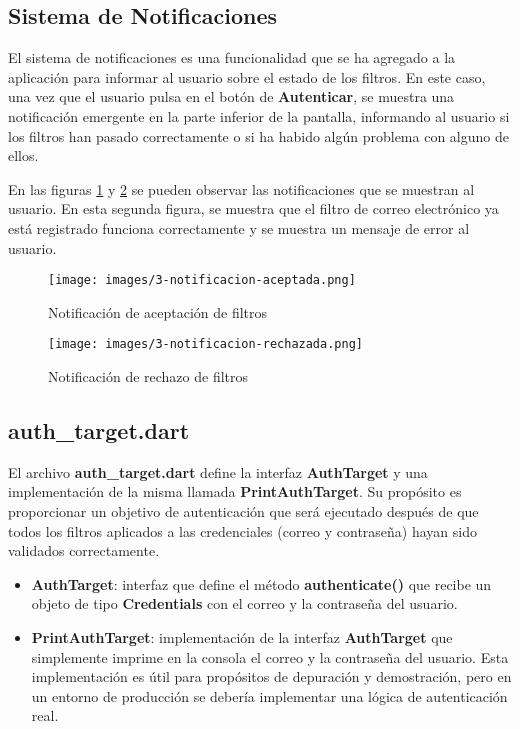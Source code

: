 \documentclass[12pt]{article}
\begin{document}
\subsection{Sistema de Notificaciones}

El sistema de notificaciones es una funcionalidad que se ha agregado a la aplicación para informar al usuario sobre el estado de los filtros. En este caso, una vez que el usuario pulsa en el botón de \textbf{Autenticar}, se muestra una notificación emergente en la parte inferior de la pantalla, informando al usuario si los filtros han pasado correctamente o si ha habido algún problema con alguno de ellos.

En las figuras \ref{fig:3-notificacion-aceptada} y \ref{fig:3-notificacion-rechazada} se pueden observar las notificaciones que se muestran al usuario. En esta segunda figura, se muestra que el filtro de correo electrónico ya está registrado funciona correctamente y se muestra un mensaje de error al usuario.

\begin{figure}[H]
    \centering
    \texttt{[image: images/3-notificacion-aceptada.png]}
    \caption{Notificación de aceptación de filtros}
    \label{fig:3-notificacion-aceptada}
\end{figure}

\begin{figure}[H]
    \centering
    \texttt{[image: images/3-notificacion-rechazada.png]}
    \caption{Notificación de rechazo de filtros}
    \label{fig:3-notificacion-rechazada}
\end{figure}

\subsection{auth\_target.dart}

El archivo \textbf{auth\_target.dart} define la interfaz \textbf{AuthTarget} y una implementación de la misma llamada \textbf{PrintAuthTarget}. Su propósito es proporcionar un objetivo de autenticación que será ejecutado después de que todos los filtros aplicados a las credenciales (correo y contraseña) hayan sido validados correctamente.

\begin{itemize}
    \item \textbf{AuthTarget}: interfaz que define el método \textbf{authenticate()} que recibe un objeto de tipo \textbf{Credentials} con el correo y la contraseña del usuario.
    \item \textbf{PrintAuthTarget}: implementación de la interfaz \textbf{AuthTarget} que simplemente imprime en la consola el correo y la contraseña del usuario. Esta implementación es útil para propósitos de depuración y demostración, pero en un entorno de producción se debería implementar una lógica de autenticación real.
\end{itemize}
\end{document}
